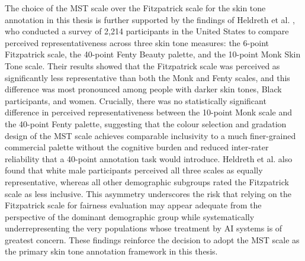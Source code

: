 The choice of the MST scale over the Fitzpatrick scale for the skin tone annotation in this thesis is further supported by the findings of Heldreth et al. \cite{Heldreth_2024_WhichSkinToneMeasures}, who conducted a survey of 2,214 participants in the United States to compare perceived representativeness across three skin tone measures: the 6-point Fitzpatrick scale, the 40-point Fenty Beauty palette, and the 10-point Monk Skin Tone scale. Their results showed that the Fitzpatrick scale was perceived as significantly less representative than both the Monk and Fenty scales, and this difference was most pronounced among people with darker skin tones, Black participants, and women. Crucially, there was no statistically significant difference in perceived representativeness between the 10-point Monk scale and the 40-point Fenty palette, suggesting that the colour selection and gradation design of the MST scale achieves comparable inclusivity to a much finer-grained commercial palette without the cognitive burden and reduced inter-rater reliability that a 40-point annotation task would introduce. Heldreth et al. also found that white male participants perceived all three scales as equally representative, whereas all other demographic subgroups rated the Fitzpatrick scale as less inclusive. This asymmetry underscores the risk that relying on the Fitzpatrick scale for fairness evaluation may appear adequate from the perspective of the dominant demographic group while systematically underrepresenting the very populations whose treatment by AI systems is of greatest concern. These findings reinforce the decision to adopt the MST scale as the primary skin tone annotation framework in this thesis.

